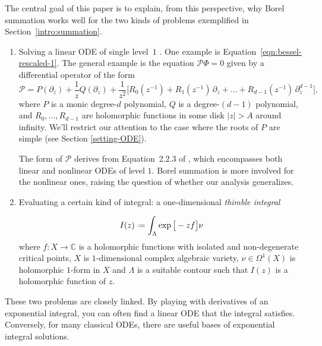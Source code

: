 \documentclass{article}
\theoremstyle{definition}
\newcommand*{\defeq}{\mathrel{\vcenter{\baselineskip0.5ex \lineskiplimit0pt
                     \hbox{\scriptsize.}\hbox{\scriptsize.}}}%
                     =}
\begin{document}
The central goal of this paper is to explain, from this perspective, why Borel summation works well for the two kinds of problems exemplified in Section~\ref{intro:summation}.
\begin{enumerate}
\item Solving a linear ODE of single level~$1$ \cite[Section 2.1]{EcalleIII}\textcolor{DarkTurquoise}{\cite[Section~5.2.2.1]{diverg-resurg-iii}}. One example is Equation~\eqref{eqn:bessel-rescaled-1}. The general example is the equation $\mathcal{P} \Phi = 0$ given by a differential operator of the form
\[ \mathcal{P} = P(\partial_z) + \frac{1}{z} Q(\partial_z) + \frac{1}{z^2}\big[ R_0(z^{-1}) + R_1(z^{-1})\,\partial_z + \ldots + R_{d-1}(z^{-1})\,\partial_z^{d-1} \big], \]
where $P$ is a monic degree-$d$ polynomial, $Q$ is a degree-$(d-1)$ polynomial, and $R_0, \ldots, R_{d-1}$ are holomorphic functions in some disk $|z|>A$ around infinity. We'll restrict our attention to the case where the roots of $P$ are simple (see Section \ref{setting-ODE}).

The form of $\mathcal{P}$ derives from Equation~2.2.3 of \cite[pag. 105]{EcalleIII}, which encompasses both linear and nonlinear ODEs of level $1$. Borel summation is more involved for the nonlinear ones, raising the question of whether our analysis generalizes.

\item Evaluating a certain kind of integral: a one-dimensional {\em thimble integral}

\begin{equation*}
I(z)\defeq\int_{\Lambda}\exp\big[-z f\big] \nu
\end{equation*}
where $f\colon X\to \mathbb{C}$ is a holomorphic functions with isolated and non-degenerate critical points, $X$ is $1$-dimensional complex algebraic variety, $\nu\in\Omega^1(X)$ is holomorphic $1$-form in $X$ and $\Lambda$ is a suitable contour such that $I(z)$ is a holomorphic function of $z$.  
\end{enumerate}

These two problems are closely linked. By playing with derivatives of an exponential integral, you can often find a linear ODE that the integral satisfies. Conversely, for many classical ODEs, there are useful bases of exponential integral solutions.

\end{document}
